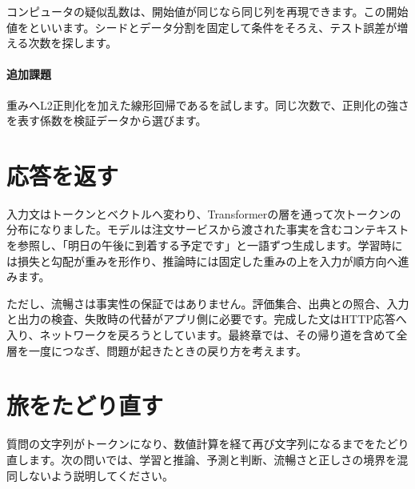         コンピュータの疑似乱数は、開始値が同じなら同じ列を再現できます。この開始値をといいます。シードとデータ分割を固定して条件をそろえ、テスト誤差が増える次数を探します。

\paragraph{追加課題}
        重みへL2正則化を加えた線形回帰であるを試します。同じ次数で、正則化の強さを表す係数を検証データから選びます。

\par
\endgroup
\par
\endgroup


\section{応答を返す}
\label{sec:06-machine-learning-35}

入力文はトークンとベクトルへ変わり、Transformerの層を通って次トークンの分布になりました。モデルは注文サービスから渡された事実を含むコンテキストを参照し、「明日の午後に到着する予定です」と一語ずつ生成します。学習時には損失と勾配が重みを形作り、推論時には固定した重みの上を入力が順方向へ進みます。

ただし、流暢さは事実性の保証ではありません。評価集合、出典との照合、入力と出力の検査、失敗時の代替がアプリ側に必要です。完成した文はHTTP応答へ入り、ネットワークを戻ろうとしています。最終章では、その帰り道を含めて全層を一度につなぎ、問題が起きたときの戻り方を考えます。



\section{旅をたどり直す}
\label{sec:06-machine-learning-36}

質問の文字列がトークンになり、数値計算を経て再び文字列になるまでをたどり直します。次の問いでは、学習と推論、予測と判断、流暢さと正しさの境界を混同しないよう説明してください。

